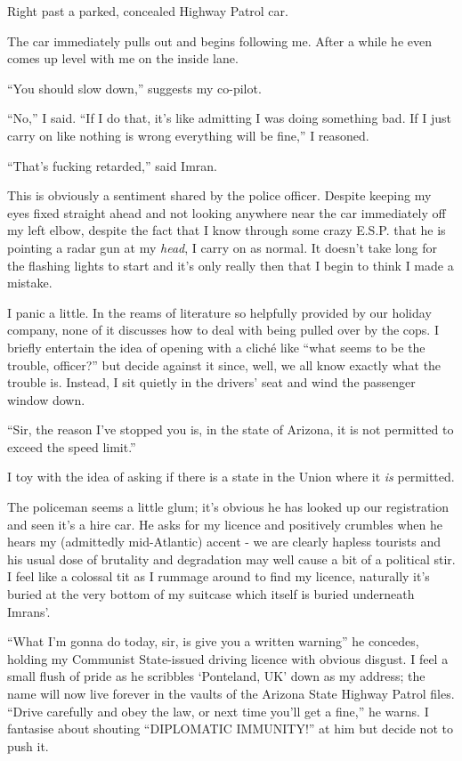 \documentclass[a5paper,titlepage,11pt]{book}
\begin{document}
Right past a parked, concealed Highway Patrol car.

The car immediately pulls out and begins following me.  After a while he even comes up level with me on the inside lane.

``You should slow down,'' suggests my co-pilot.

``No,'' I said.  ``If I do that, it's like admitting I was doing something bad.  If I just carry on like nothing is wrong everything will be fine,'' I reasoned.

``That's fucking retarded,'' said Imran.

This is obviously a sentiment shared by the police officer.  Despite keeping my eyes fixed straight ahead and not looking anywhere near the car immediately off my left elbow, despite the fact that I know through some crazy E.S.P. that he is pointing a radar gun at my \emph{head}, I carry on as normal.  It doesn't take long for the flashing lights to start and it's only really then that I begin to think I made a mistake.

I panic a little.  In the reams of literature so helpfully provided by our holiday company, none of it discusses how to deal with being pulled over by the cops.  I briefly entertain the idea of opening with a clich\'{e} like ``what seems to be the trouble, officer?'' but decide against it since, well, we all know exactly what the trouble is.  Instead, I sit quietly in the drivers' seat and wind the passenger window down.

``Sir, the reason I've stopped you is, in the state of Arizona, it is not permitted to exceed the speed limit.''

I toy with the idea of asking if there is a state in the Union where it \emph{is} permitted.

The policeman seems a little glum; it's obvious he has looked up our registration and seen it's a hire car.  He asks for my licence and positively crumbles when he hears my (admittedly mid-Atlantic) accent - we are clearly hapless tourists and his usual dose of brutality and degradation may well cause a bit of a political stir.  I feel like a colossal tit as I rummage around to find my licence, naturally it's buried at the very bottom of my suitcase which itself is buried underneath Imrans'.

``What I'm gonna do today, sir, is give you a written warning'' he concedes, holding my Communist State-issued driving licence with obvious disgust.  I feel a small flush of pride as he scribbles `Ponteland, UK' down as my address; the name will now live forever in the vaults of the Arizona State Highway Patrol files.  ``Drive carefully and obey the law, or next time you'll get a fine,'' he warns.  I fantasise about shouting ``DIPLOMATIC IMMUNITY!'' at him but decide not to push it.
\end{document}
